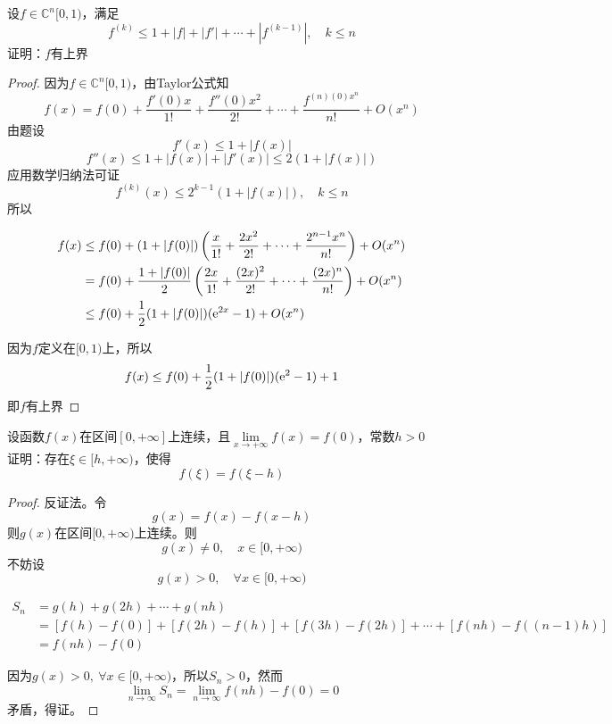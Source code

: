 \begin{proposition}
    
    设$f \in \mathbb{C}^{n}[0,1)$，满足
    $$f^{(k)} \leq 1 + |f| + |f'| + \cdots + |f^{(k - 1)}|,\quad k \leq n$$
    证明：$f$有上界

\end{proposition}

\begin{proof}
    因为$f \in \mathbb{C}^{n}[0,1)$，由\textup{Taylor}公式知
    $$f(x) = f(0) + \dfrac{f'(0)x}{1!} + \dfrac{f''(0)x^2}{2!} + \cdots + \dfrac{f^{(n)(0)x^n}}{n!} + O(x^n)$$
    由题设
    $$f'(x) \leq 1 + |f(x)|$$
    $$f''(x) \leq 1 + |f(x)| + |f'(x)| \leq 2(1 + |f(x)|)$$
    应用数学归纳法可证
    $$f^{(k)}(x) \leq 2^{k - 1}(1 + |f(x)|), \quad k \leq n$$
    所以

    \begin{align*}
        f(x) & \leq f(0) + (1 + |f(0)|)\left( \dfrac{x}{1!} + \dfrac{2x^2}{2!} + \cdots + \dfrac{2^{n - 1}x^n}{n!} \right) + O(x^n) \\
        & = f(0) + \dfrac{1 + |f(0)|}{2}\left( \dfrac{2x}{1!} + \dfrac{(2x)^2}{2!} + \cdots + \dfrac{(2x)^{n}}{n!} \right) + O(x^n) \\
        & \leq f(0) + \dfrac{1}{2}(1 + |f(0)|)(\mathrm{e}^{2x} - 1) + O(x^n)
    \end{align*}

    因为$f$定义在$[0,1)$上，所以
    $$f(x) \leq f(0) + \dfrac{1}{2}(1 + |f(0)|)(\mathrm{e}^2 - 1) + 1$$
    即$f$有上界
    
\end{proof}

\begin{proposition}
    设函数$f(x)$在区间$[0, +\infty]$上连续，且$\lim\limits_{x \to +\infty}{f(x)} = f(0)$，常数$h > 0$ \\
    证明：存在$\xi \in [h, +\infty)$，使得
    $$f(\xi) = f(\xi - h)$$
\end{proposition}

\begin{proof}

    反证法。令
    $$g(x) = f(x) - f(x - h)$$
    则$g(x)$在区间$[0,+\infty)$上连续。则
    $$g(x) \neq 0, \quad x \in [0,+\infty)$$
    不妨设
    $$g(x) > 0, \quad \forall x \in [0,+\infty)$$
    
    \begin{align*}
        S_n & = g(h) + g(2h) + \cdots + g(nh) \\
        & = [f(h) - f(0)] + [f(2h) - f(h)] + [f(3h) - f(2h)] + \cdots + [f(nh) - f((n - 1)h)] \\
        & = f(nh) - f(0)
    \end{align*}
  
    因为$g(x) > 0, \ \forall x \in [0,+\infty)$，所以$S_n > 0$，然而
    $$\lim\limits_{n \to \infty}{S_n} = \lim\limits_{n \to \infty}{f(nh)} - f(0) = 0$$
    矛盾，得证。

\end{proof}

